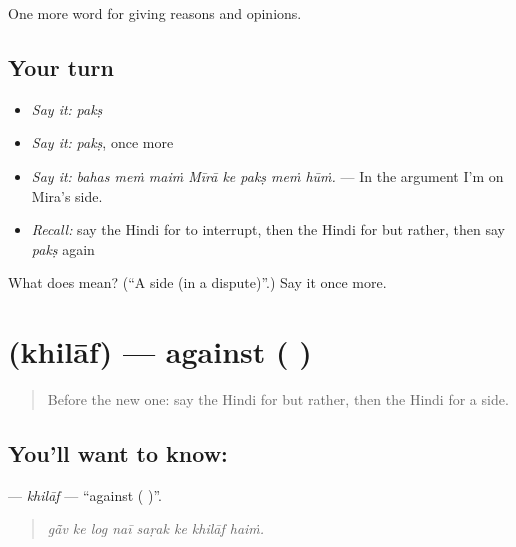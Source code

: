 \begin{grammarlens}[title={What you've built}]
One more word for giving reasons and opinions.
\end{grammarlens}

\subsection*{Your turn}
\begin{itemize}
\raggedright
  \item \emph{Say it:} \emph{pakṣ}
  \item \emph{Say it:} \emph{pakṣ}, once more
  \item \emph{Say it:} \emph{bahas meṁ maiṁ Mīrā ke pakṣ meṁ hūṁ.} — In the argument I'm on Mira's side.
  \item \emph{Recall:} say the Hindi for to interrupt, then the Hindi for but rather, then say \emph{pakṣ} again
\end{itemize}

\begin{tcolorbox}[breakable,colback=teal!4,colframe=teal!35!black,title={Before you move on}]
What does  mean? (\textquotedblleft{}A side (in a dispute)\textquotedblright{}.) Say it once more.
\end{tcolorbox}
\section[\texorpdfstring{\hi{ख़िलाफ़} (khilāf)}{ख़िलाफ़ (khilāf)}]{ (khilāf) — against ( )}

\label{lesson:HI-C347-khilaf}



\begin{quote}
Before the new one: say the Hindi for but rather, then the Hindi for a side.
\end{quote}

\subsection*{You'll want to know: }
\textbf{} — \emph{khilāf} — \textquotedblleft{}against ( )\textquotedblright{}.

\begin{quote}
       
\end{quote}

\begin{quote}
\emph{gā̃v ke log naī saṛak ke khilāf haiṁ.}
\end{quote}

